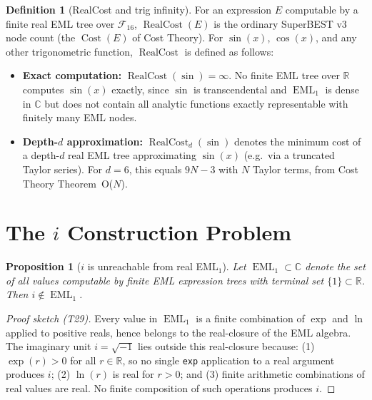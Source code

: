 \documentclass[12pt,a4paper]{article}
\newtheorem{proposition}[theorem]{Proposition}
\theoremstyle{definition}
\newtheorem{definition}[theorem]{Definition}
\newcommand{\EML}{\operatorname{EML}}
\newcommand{\Cost}{\operatorname{Cost}}
\newcommand{\RC}{\operatorname{RealCost}}
\begin{document}
\begin{definition}[RealCost and trig infinity]
\label{def:RC-trig}
For an expression $E$ computable by a finite real EML tree over
$\mathcal{F}_{16}$, $\RC(E)$ is the ordinary SuperBEST v3 node count (the
$\Cost(E)$ of Cost Theory).
For $\sin(x)$, $\cos(x)$, and any other trigonometric function, $\RC$ is
defined as follows:
\begin{itemize}
  \item \textbf{Exact computation:} $\RC(\sin) = \infty$.  No finite EML tree
        over $\mathbb{R}$ computes $\sin(x)$ exactly, since $\sin$ is
        transcendental and $\EML_1$ is dense in $\mathbb{C}$ but does not
        contain all analytic functions exactly representable with finitely many
        EML nodes.
  \item \textbf{Depth-$d$ approximation:} $\RC_d(\sin)$ denotes the minimum
        cost of a depth-$d$ real EML tree approximating $\sin(x)$ (e.g.\ via a
        truncated Taylor series).  For $d = 6$, this equals $9N-3$ with $N$
        Taylor terms, from Cost Theory Theorem~O($N$).
\end{itemize}
\end{definition}

\section{The $i$ Construction Problem}
\label{sec:i-construction}

\begin{proposition}[$i$ is unreachable from real EML$_1$]
\label{prop:i-unreachable}
Let $\EML_1 \subset \mathbb{C}$ denote the set of all values computable by
finite EML expression trees with terminal set $\{1\} \subset \mathbb{R}$.
Then $i \notin \EML_1$.
\end{proposition}

\begin{proof}[Proof sketch (T29)]
Every value in $\EML_1$ is a finite combination of $\exp$ and $\ln$ applied
to positive reals, hence belongs to the real-closure of the EML algebra.
The imaginary unit $i = \sqrt{-1}$ lies outside this real-closure because:
(1) $\exp(r) > 0$ for all $r \in \mathbb{R}$, so no single \texttt{exp}
    application to a real argument produces $i$;
(2) $\ln(r)$ is real for $r > 0$; and
(3) finite arithmetic combinations of real values are real.
No finite composition of such operations produces $i$.
\end{proof}
\end{document}
